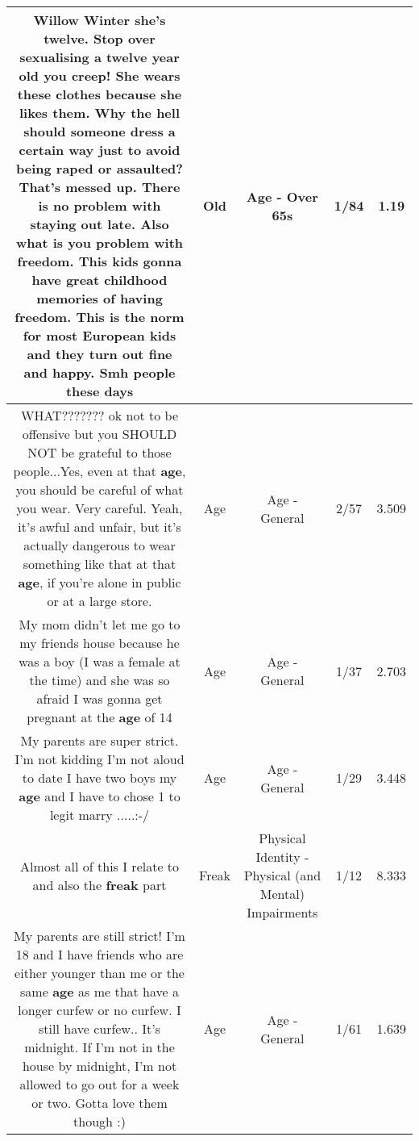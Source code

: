 \documentclass[11pt]{article}
\newlength\mylength
\begin{document}
\begin{center}
\begin{longtable}{|C{.65\mylength}|C{.30\mylength}|C{.12\mylength}|C{.12\mylength}|C{.12\mylength}|}
  \small Willow Winter she's twelve. Stop over sexualising a twelve year \textbf{old} you creep! She wears these clothes because she likes them. Why the hell should someone dress a certain way just to avoid being raped or assaulted? That's messed up. There is no problem with staying out late. Also what is you problem with freedom. This kids gonna have great childhood memories of having freedom. This is the norm for most European kids and they turn out fine and happy. Smh people these days\normalsize   & Old & Age - Over 65s & 1/84 & 1.19 \\  \hline
  \small WHAT??????? ok not to be offensive but you SHOULD NOT be grateful to those people...Yes,  even at that \textbf{age}, you should be careful of what you wear. Very careful. Yeah,  it's awful and unfair,  but it's actually dangerous to wear something like that at that \textbf{age},  if you're alone in public or at a large store.\normalsize   & Age & Age - General & 2/57 & 3.509 \\  \hline
  \small My mom didn't let me go to my friends house because he was a boy (I was a female at the time) and she was so afraid I was gonna get pregnant at the \textbf{age} of 14\normalsize   & Age & Age - General & 1/37 & 2.703 \\  \hline
  \small My parents are super strict. I'm not kidding I'm not aloud to date I have two boys my \textbf{age} and I have to chose 1 to legit marry .....:-/\normalsize   & Age & Age - General & 1/29 & 3.448 \\  \hline
  \small Almost all of this I relate to and also the \textbf{freak} part\normalsize   & Freak & Physical Identity - Physical (and Mental) Impairments & 1/12 & 8.333 \\  \hline
  \small My parents are still strict! I'm 18 and I have friends who are either younger than me or the same \textbf{age} as me that have a longer curfew or no curfew. I still have curfew.. It's midnight. If I'm not in the house by midnight, I'm not allowed to go out for a week or two. Gotta love them though :)\normalsize   & Age & Age - General & 1/61 & 1.639 \\  \hline

\end{longtable}
\end{center}
\end{document}
